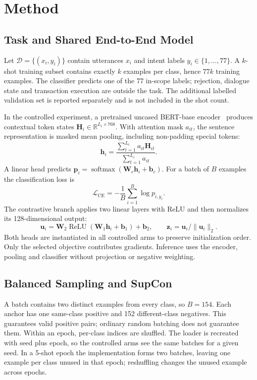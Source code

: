 \documentclass[runningheads]{llncs}
\begin{document}
\section{Method}
\subsection{Task and Shared End-to-End Model}
Let $\mathcal D=\{(x_i,y_i)\}$ contain utterances $x_i$ and intent labels $y_i\in\{1,\ldots,77\}$. A $k$-shot training subset contains exactly $k$ examples per class, hence $77k$ training examples. The classifier predicts one of the 77 in-scope labels; rejection, dialogue state and transaction execution are outside the task. The additional labelled validation set is reported separately and is not included in the shot count.

In the controlled experiment, a pretrained uncased BERT-base encoder~\cite{bert} produces contextual token states $\mathbf H_i\in\mathbb R^{L_i\times768}$. With attention mask $a_{it}$, the sentence representation is masked mean pooling, including non-padding special tokens:
\begin{equation}
\mathbf h_i=\frac{\sum_{t=1}^{L_i}a_{it}\mathbf H_{it}}{\sum_{t=1}^{L_i}a_{it}}.
\label{eq:pool}
\end{equation}
A linear head predicts $\mathbf p_i=\operatorname{softmax}(\mathbf W_c\mathbf h_i+\mathbf b_c)$. For a batch of $B$ examples the classification loss is
\begin{equation}
\mathcal L_{\mathrm{CE}}=-\frac1B\sum_{i=1}^B\log p_{i,y_i}.
\end{equation}
The contrastive branch applies two linear layers with ReLU and then normalizes its 128-dimensional output:
\begin{equation}
\mathbf u_i=\mathbf W_2\operatorname{ReLU}(\mathbf W_1\mathbf h_i+\mathbf b_1)+\mathbf b_2,
\qquad \mathbf z_i=\mathbf u_i/\|\mathbf u_i\|_2.
\end{equation}
Both heads are instantiated in all controlled arms to preserve initialization order. Only the selected objective contributes gradients. Inference uses the encoder, pooling and classifier without projection or negative weighting.

\subsection{Balanced Sampling and SupCon}
A batch contains two distinct examples from every class, so $B=154$. Each anchor has one same-class positive and 152 different-class negatives. This guarantees valid positive pairs; ordinary random batching does not guarantee them. Within an epoch, per-class indices are shuffled. The loader is recreated with seed plus epoch, so the controlled arms see the same batches for a given seed. In a 5-shot epoch the implementation forms two batches, leaving one example per class unused in that epoch; reshuffling changes the unused example across epochs.
\end{document}
